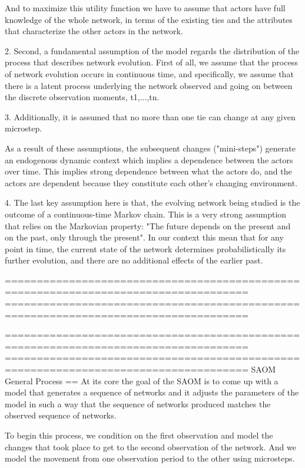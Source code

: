 And to maximize this utility function we have to assume that actors have full knowledge of the whole network, in terms of the existing ties and the attributes that characterize the other actors in the network. 

2. Second, a fundamental assumption of the model regards the distribution of the process that describes network evolution. First of all, we assume that the process of network evolution occurs in continuous time, and specifically, we assume that there is a latent process underlying the network observed and going on between the discrete observation moments,  t1,...,tn. 

3. Additionally, it is assumed that no more than one tie can change at any given microstep. 

As a result of these assumptions, the subsequent changes ("mini-steps") generate an endogenous dynamic context which implies a dependence between the actors over time. This implies strong dependence between what the actors do, and the actors are dependent because they constitute each other's changing environment.

4. The last key assumption here is that, the evolving network being studied is the outcome of a continuous-time Markov chain. This is a very strong assumption that relies on the Markovian property: "The future depends on the present and on the past, only through the present". In our context this mean that for any point in time, the current state of the network determines probabilistically its further evolution, and there are no additional effects of the earlier past. 

====================================================================================
====================================================================================

====================================================================================
====================================================================================
SAOM General Process
==
At its core the goal of the SAOM is to come up with a model that generates a sequence of networks and it adjusts the parameters of the model in such a way that the sequence of networks produced matches the observed sequence of networks.

To begin this process, we condition on the first observation and model the changes that took place to get to the second observation of the network. And we model the movement from one observation period to the other using  microsteps. 

